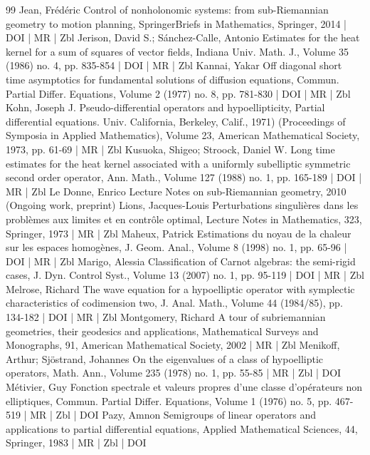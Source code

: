 \documentclass[10pt]{amsart}
\theoremstyle{definition}\newtheorem{defi}[theo]{Definition}\newtheorem{rema}[theo]{Remark}\newtheorem{exam}[theo]{Example}\newtheorem{exem}[theo]{Example}\newtheorem{nota}[theo]{Notation}
\begin{document}
\begin{thebibliography}{99}
Jean, Frédéric Control of nonholonomic systems: from sub-Riemannian geometry to motion planning, SpringerBriefs in Mathematics, Springer, 2014 | DOI | MR | Zbl
Jerison, David S.; Sánchez-Calle, Antonio Estimates for the heat kernel for a sum of squares of vector fields, Indiana Univ. Math. J., Volume 35 (1986) no. 4, pp. 835-854 | DOI | MR | Zbl
Kannai, Yakar Off diagonal short time asymptotics for fundamental solutions of diffusion equations, Commun. Partial Differ. Equations, Volume 2 (1977) no. 8, pp. 781-830 | DOI | MR | Zbl
Kohn, Joseph J. Pseudo-differential operators and hypoellipticity, Partial differential equations. Univ. California, Berkeley, Calif., 1971) (Proceedings of Symposia in Applied Mathematics), Volume 23, American Mathematical Society, 1973, pp. 61-69 | MR | Zbl
Kusuoka, Shigeo; Stroock, Daniel W. Long time estimates for the heat kernel associated with a uniformly subelliptic symmetric second order operator, Ann. Math., Volume 127 (1988) no. 1, pp. 165-189 | DOI | MR | Zbl
Le Donne, Enrico Lecture Notes on sub-Riemannian geometry, 2010 (Ongoing work, preprint)
Lions, Jacques-Louis Perturbations singulières dans les problèmes aux limites et en contrôle optimal, Lecture Notes in Mathematics, 323, Springer, 1973 | MR | Zbl
Maheux, Patrick Estimations du noyau de la chaleur sur les espaces homogènes, J. Geom. Anal., Volume 8 (1998) no. 1, pp. 65-96 | DOI | MR | Zbl
Marigo, Alessia Classification of Carnot algebras: the semi-rigid cases, J. Dyn. Control Syst., Volume 13 (2007) no. 1, pp. 95-119 | DOI | MR | Zbl
Melrose, Richard The wave equation for a hypoelliptic operator with symplectic characteristics of codimension two, J. Anal. Math., Volume 44 (1984/85), pp. 134-182 | DOI | MR | Zbl
Montgomery, Richard A tour of subriemannian geometries, their geodesics and applications, Mathematical Surveys and Monographs, 91, American Mathematical Society, 2002 | MR | Zbl
Menikoff, Arthur; Sjöstrand, Johannes On the eigenvalues of a class of hypoelliptic operators, Math. Ann., Volume 235 (1978) no. 1, pp. 55-85 | MR | Zbl | DOI
Métivier, Guy Fonction spectrale et valeurs propres d’une classe d’opérateurs non elliptiques, Commun. Partial Differ. Equations, Volume 1 (1976) no. 5, pp. 467-519 | MR | Zbl | DOI
Pazy, Amnon Semigroups of linear operators and applications to partial differential equations, Applied Mathematical Sciences, 44, Springer, 1983 | MR | Zbl | DOI

\end{thebibliography}
\end{document}
